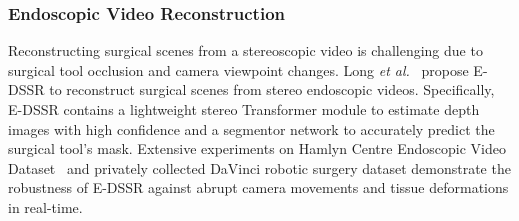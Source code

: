\documentclass[10pt,journal,compsoc]{IEEEtran}
\begin{document}
\subsubsection{\textbf{Endoscopic Video Reconstruction}}
Reconstructing surgical scenes from a stereoscopic video is challenging due to surgical tool occlusion and camera viewpoint changes. Long \textit{et al.}~\cite{long2021dssr} propose E-DSSR to reconstruct surgical scenes from stereo endoscopic videos. Specifically, E-DSSR contains a lightweight stereo Transformer module to estimate depth images with high confidence and a segmentor network to accurately predict the surgical tool's mask. Extensive experiments on Hamlyn Centre Endoscopic Video Dataset~\cite{ye2017self} and privately collected DaVinci robotic surgery dataset demonstrate the robustness of E-DSSR against abrupt camera movements and tissue deformations in real-time.%
\end{document}
